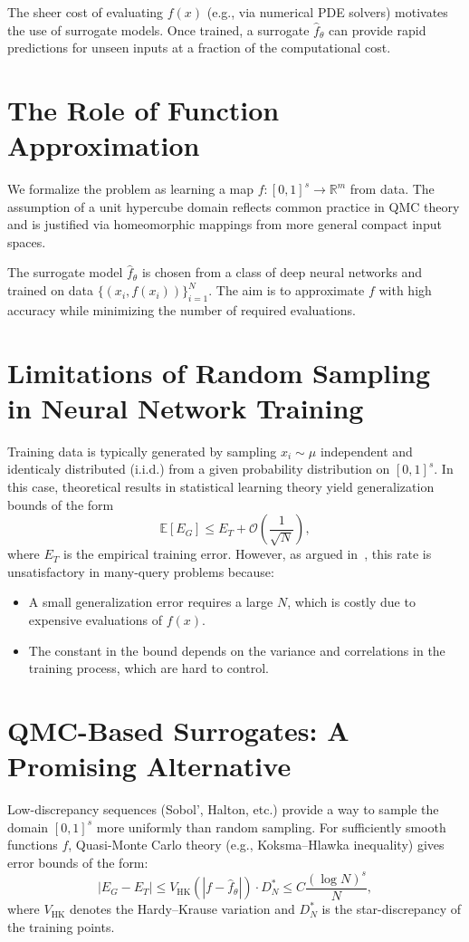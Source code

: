 The sheer cost of evaluating $f(x)$ (e.g., via numerical PDE solvers) motivates
the use of surrogate models. Once trained, a surrogate $\hat{f}_\theta$ can
provide rapid predictions for unseen inputs at a fraction of the computational
cost.

\section{The Role of Function Approximation}
We formalize the problem as learning a map $f \colon [0,1]^s \to \mathbb{R}^m$
from data. The assumption of a unit hypercube domain reflects common practice in
QMC theory and is justified via homeomorphic mappings from more general compact
input spaces.

The surrogate model $\hat{f}_\theta$ is chosen from a class of deep neural
networks and trained on data $\{(x_i, f(x_i))\}_{i=1}^N$. The aim is to
approximate $f$ with high accuracy while minimizing the number of required
evaluations.

\section{Limitations of Random Sampling in Neural Network Training}
Training data is typically generated by sampling $x_i \sim \mu$ independent and identicaly distributed (i.i.d.) from a
given probability distribution on $[0,1]^s$. In this case, theoretical results
in statistical learning theory yield generalization bounds of the form
\begin{equation*}
\mathbb{E}[E_G] \leq E_T + \mathcal{O}\left(\frac{1}{\sqrt{N}}\right),
\end{equation*}
where $E_T$ is the empirical training error. However, as argued
in~\cite{mishra2021enhancing}, this rate is unsatisfactory in many-query
problems because:
\begin{itemize}
  \item A small generalization error requires a large $N$, which is costly due
  to expensive evaluations of $f(x)$.
  \item The constant in the bound depends on the variance and correlations in
  the training process, which are hard to control.
\end{itemize}

\section{QMC-Based Surrogates: A Promising Alternative}
Low-discrepancy sequences (Sobol', Halton, etc.) provide a way to sample the
domain $[0,1]^s$ more uniformly than random sampling. For sufficiently smooth
functions $f$, Quasi-Monte Carlo theory (e.g., Koksma--Hlawka inequality) gives
error bounds of the form:
\begin{equation*}
|E_G - E_T| \leq V_{\mathrm{HK}}(|f - \hat{f}_\theta|) \cdot D^*_N \leq C \frac{(\log N)^s}{N},
\end{equation*}
where $V_{\mathrm{HK}}$ denotes the Hardy–Krause variation and $D^*_N$ is the
star-discrepancy of the training points.


